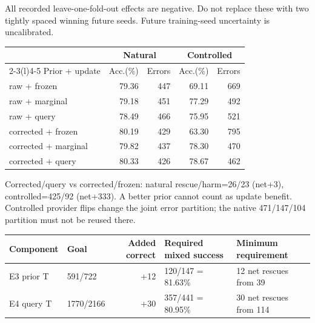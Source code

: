 \documentclass[10pt,letterpaper]{article}
\newcommand{\B}[1]{{\color{GuideBlue}#1}}
\newcommand{\note}[1]{{\fontsize{8.5}{10.5}\selectfont #1\par}}
\newcommand{\sect}[1]{\vspace{5pt}{\large\bfseries #1}\par\vspace{2pt}}
\newenvironment{clean}{\begin{center}\fontsize{9.5}{11.5}\selectfont\setlength{\tabcolsep}{6pt}\renewcommand{\arraystretch}{1.06}}{\end{center}}
\begin{document}
\note{All recorded leave-one-fold-out effects are negative. Do not replace these with two tightly spaced winning future seeds. Future training-seed uncertainty is uncalibrated.}
\sect{E4 / body Table 6: keep prior and update effects separate}
\par\noindent\begin{minipage}{\linewidth}\end{minipage}\par
\begin{clean}\begin{tabular}{@{}lrrrr@{}}
\toprule
& \multicolumn{2}{c}{Natural} & \multicolumn{2}{c}{Controlled} \\ \cmidrule(lr){2-3}\cmidrule(l){4-5} Prior + update & Acc.(\%) & Errors & Acc.(\%) & Errors \\
\midrule
raw + frozen & 79.36 & 447 & 69.11 & 669 \\
raw + marginal & 79.18 & 451 & 77.29 & 492 \\
raw + query & 78.49 & 466 & 75.95 & 521 \\
corrected + frozen & 80.19 & 429 & 63.30 & 795 \\
corrected + marginal & 79.82 & 437 & 78.30 & 470 \\
corrected + query & 80.33 & 426 & 78.67 & 462 \\
\bottomrule\end{tabular}\end{clean}
\note{Corrected/query vs corrected/frozen: natural rescue/harm=26/23 (net+3), controlled=425/92 (net+333). A better prior cannot count as update benefit. Controlled provider flips change the joint error partition; the native 471/147/104 partition must not be reused there.}
\par\noindent\begin{minipage}{\linewidth}\end{minipage}\par
\begin{clean}\begin{tabular}{@{}llrll@{}}
\toprule
Component & Goal & Added correct & Required mixed success & Minimum requirement \\
\midrule
\B{E3 prior T} & \B{591/722} & \B{+12} & \B{120/147 = 81.63\%} & \B{12 net rescues from 39} \\
\B{E4 query T} & \B{1770/2166} & \B{+30} & \B{357/441 = 80.95\%} & \B{30 net rescues from 114} \\
\bottomrule\end{tabular}\end{clean}
\end{document}
